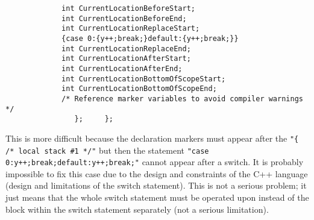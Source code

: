 \begin{enumerate}
{{\begin{verbatim}
             int CurrentLocationBeforeStart;
             int CurrentLocationBeforeEnd;
             int CurrentLocationReplaceStart;
             {case 0:{y++;break;}default:{y++;break;}}
             int CurrentLocationReplaceEnd;
             int CurrentLocationAfterStart;
             int CurrentLocationAfterEnd;
             int CurrentLocationBottomOfScopeStart;
             int CurrentLocationBottomOfScopeEnd;
             /* Reference marker variables to avoid compiler warnings */
                };     };
\end{verbatim}
}}
        This is more difficult because the declaration markers must appear after 
        the {\tt "\{ /* local stack \#1 */"} but then the statement 
        {\tt "{case 0:{y++;break;}default:{y++;break;}}"}
        cannot appear after a switch.  It is probably impossible to fix this case due to the
        design and constraints of the C++ language (design and limitations of the switch statement).
        This is not a serious problem; it just means that the whole switch statement must
        be operated upon instead of the block within the switch statement separately (not
        a serious limitation).
\end{enumerate}






